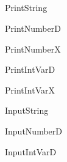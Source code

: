 \subsection{}

\begin{procdesc}{PrintString}{}
\end{procdesc}

\begin{procdesc}{PrintNumberD}{}
\end{procdesc}

\begin{procdesc}{PrintNumberX}{}
\end{procdesc}

\begin{procdesc}{PrintIntVarD}{}
\end{procdesc}

\begin{procdesc}{PrintIntVarX}{}
\end{procdesc}

\begin{procdesc}{InputString}{}
\end{procdesc}

\begin{procdesc}{InputNumberD}{}
\end{procdesc}

\begin{procdesc}{InputIntVarD}{}
\end{procdesc}

